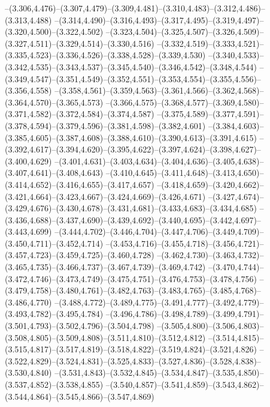   --(3.306,4.476)--(3.307,4.479)--(3.309,4.481)--(3.310,4.483)--(3.312,4.486)--(3.313,4.488)%
  --(3.314,4.490)--(3.316,4.493)--(3.317,4.495)--(3.319,4.497)--(3.320,4.500)--(3.322,4.502)%
  --(3.323,4.504)--(3.325,4.507)--(3.326,4.509)--(3.327,4.511)--(3.329,4.514)--(3.330,4.516)%
  --(3.332,4.519)--(3.333,4.521)--(3.335,4.523)--(3.336,4.526)--(3.338,4.528)--(3.339,4.530)%
  --(3.340,4.533)--(3.342,4.535)--(3.343,4.537)--(3.345,4.540)--(3.346,4.542)--(3.348,4.544)%
  --(3.349,4.547)--(3.351,4.549)--(3.352,4.551)--(3.353,4.554)--(3.355,4.556)--(3.356,4.558)%
  --(3.358,4.561)--(3.359,4.563)--(3.361,4.566)--(3.362,4.568)--(3.364,4.570)--(3.365,4.573)%
  --(3.366,4.575)--(3.368,4.577)--(3.369,4.580)--(3.371,4.582)--(3.372,4.584)--(3.374,4.587)%
  --(3.375,4.589)--(3.377,4.591)--(3.378,4.594)--(3.379,4.596)--(3.381,4.598)--(3.382,4.601)%
  --(3.384,4.603)--(3.385,4.605)--(3.387,4.608)--(3.388,4.610)--(3.390,4.613)--(3.391,4.615)%
  --(3.392,4.617)--(3.394,4.620)--(3.395,4.622)--(3.397,4.624)--(3.398,4.627)--(3.400,4.629)%
  --(3.401,4.631)--(3.403,4.634)--(3.404,4.636)--(3.405,4.638)--(3.407,4.641)--(3.408,4.643)%
  --(3.410,4.645)--(3.411,4.648)--(3.413,4.650)--(3.414,4.652)--(3.416,4.655)--(3.417,4.657)%
  --(3.418,4.659)--(3.420,4.662)--(3.421,4.664)--(3.423,4.667)--(3.424,4.669)--(3.426,4.671)%
  --(3.427,4.674)--(3.429,4.676)--(3.430,4.678)--(3.431,4.681)--(3.433,4.683)--(3.434,4.685)%
  --(3.436,4.688)--(3.437,4.690)--(3.439,4.692)--(3.440,4.695)--(3.442,4.697)--(3.443,4.699)%
  --(3.444,4.702)--(3.446,4.704)--(3.447,4.706)--(3.449,4.709)--(3.450,4.711)--(3.452,4.714)%
  --(3.453,4.716)--(3.455,4.718)--(3.456,4.721)--(3.457,4.723)--(3.459,4.725)--(3.460,4.728)%
  --(3.462,4.730)--(3.463,4.732)--(3.465,4.735)--(3.466,4.737)--(3.467,4.739)--(3.469,4.742)%
  --(3.470,4.744)--(3.472,4.746)--(3.473,4.749)--(3.475,4.751)--(3.476,4.753)--(3.478,4.756)%
  --(3.479,4.758)--(3.480,4.761)--(3.482,4.763)--(3.483,4.765)--(3.485,4.768)--(3.486,4.770)%
  --(3.488,4.772)--(3.489,4.775)--(3.491,4.777)--(3.492,4.779)--(3.493,4.782)--(3.495,4.784)%
  --(3.496,4.786)--(3.498,4.789)--(3.499,4.791)--(3.501,4.793)--(3.502,4.796)--(3.504,4.798)%
  --(3.505,4.800)--(3.506,4.803)--(3.508,4.805)--(3.509,4.808)--(3.511,4.810)--(3.512,4.812)%
  --(3.514,4.815)--(3.515,4.817)--(3.517,4.819)--(3.518,4.822)--(3.519,4.824)--(3.521,4.826)%
  --(3.522,4.829)--(3.524,4.831)--(3.525,4.833)--(3.527,4.836)--(3.528,4.838)--(3.530,4.840)%
  --(3.531,4.843)--(3.532,4.845)--(3.534,4.847)--(3.535,4.850)--(3.537,4.852)--(3.538,4.855)%
  --(3.540,4.857)--(3.541,4.859)--(3.543,4.862)--(3.544,4.864)--(3.545,4.866)--(3.547,4.869)%
